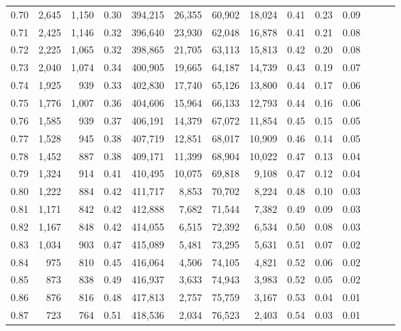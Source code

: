 \begin{tabular}{rrrrrrrrrrrrrr}
0.70 &   2,645 &  1,150 &  0.30 &  394,215 &   26,355 &  60,902 &  18,024 &  0.41 &  0.23 &      0.09 \\
0.71 &   2,425 &  1,146 &  0.32 &  396,640 &   23,930 &  62,048 &  16,878 &  0.41 &  0.21 &      0.08 \\
0.72 &   2,225 &  1,065 &  0.32 &  398,865 &   21,705 &  63,113 &  15,813 &  0.42 &  0.20 &      0.08 \\
0.73 &   2,040 &  1,074 &  0.34 &  400,905 &   19,665 &  64,187 &  14,739 &  0.43 &  0.19 &      0.07 \\
0.74 &   1,925 &    939 &  0.33 &  402,830 &   17,740 &  65,126 &  13,800 &  0.44 &  0.17 &      0.06 \\
0.75 &   1,776 &  1,007 &  0.36 &  404,606 &   15,964 &  66,133 &  12,793 &  0.44 &  0.16 &      0.06 \\
0.76 &   1,585 &    939 &  0.37 &  406,191 &   14,379 &  67,072 &  11,854 &  0.45 &  0.15 &      0.05 \\
0.77 &   1,528 &    945 &  0.38 &  407,719 &   12,851 &  68,017 &  10,909 &  0.46 &  0.14 &      0.05 \\
0.78 &   1,452 &    887 &  0.38 &  409,171 &   11,399 &  68,904 &  10,022 &  0.47 &  0.13 &      0.04 \\
0.79 &   1,324 &    914 &  0.41 &  410,495 &   10,075 &  69,818 &   9,108 &  0.47 &  0.12 &      0.04 \\
0.80 &   1,222 &    884 &  0.42 &  411,717 &    8,853 &  70,702 &   8,224 &  0.48 &  0.10 &      0.03 \\
0.81 &   1,171 &    842 &  0.42 &  412,888 &    7,682 &  71,544 &   7,382 &  0.49 &  0.09 &      0.03 \\
0.82 &   1,167 &    848 &  0.42 &  414,055 &    6,515 &  72,392 &   6,534 &  0.50 &  0.08 &      0.03 \\
0.83 &   1,034 &    903 &  0.47 &  415,089 &    5,481 &  73,295 &   5,631 &  0.51 &  0.07 &      0.02 \\
0.84 &     975 &    810 &  0.45 &  416,064 &    4,506 &  74,105 &   4,821 &  0.52 &  0.06 &      0.02 \\
0.85 &     873 &    838 &  0.49 &  416,937 &    3,633 &  74,943 &   3,983 &  0.52 &  0.05 &      0.02 \\
0.86 &     876 &    816 &  0.48 &  417,813 &    2,757 &  75,759 &   3,167 &  0.53 &  0.04 &      0.01 \\
0.87 &     723 &    764 &  0.51 &  418,536 &    2,034 &  76,523 &   2,403 &  0.54 &  0.03 &      0.01 \\

\end{tabular}
